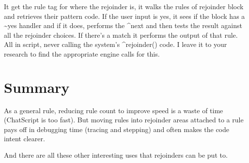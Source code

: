 \documentclass[]{article}
\begin{document}
It get the rule tag for where the rejoinder is, it walks the rules of
rejoinder block and retrieves their pattern code. If the user input is
yes, it sees if the block has a \textasciitilde{}yes handler and if it
does, performs the \^{}next and then tests the result against all the
rejoinder choices. If there's a match it performs the output of that
rule. All in script, never calling the system's \^{}rejoinder() code. I
leave it to your research to find the appropriate engine calls for this.

\section{Summary}\label{summary}

As a general rule, reducing rule count to improve speed is a waste of
time (ChatScript is too fast). But moving rules into rejoinder areas
attached to a rule pays off in debugging time (tracing and stepping) and
often makes the code intent clearer.

And there are all these other interesting uses that rejoinders can be
put to.
\end{document}
